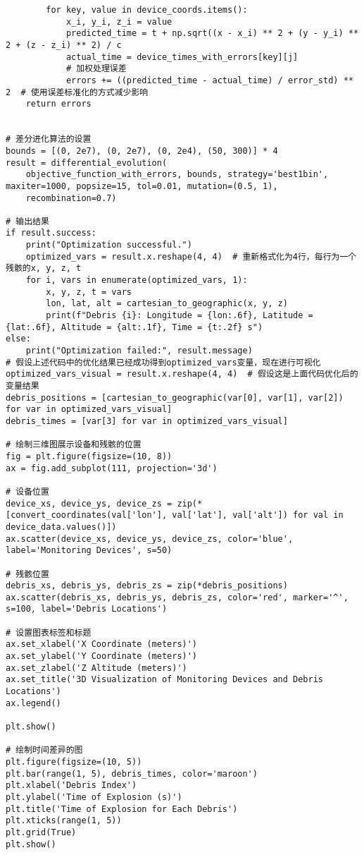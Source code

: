 \documentclass[withoutpreface,bwprint,12pt,a4paper]{cumcmthesis}
\begin{document}
\begin{appendices}
\begin{lstlisting}
        for key, value in device_coords.items():
            x_i, y_i, z_i = value
            predicted_time = t + np.sqrt((x - x_i) ** 2 + (y - y_i) ** 2 + (z - z_i) ** 2) / c
            actual_time = device_times_with_errors[key][j]
            # 加权处理误差
            errors += ((predicted_time - actual_time) / error_std) ** 2  # 使用误差标准化的方式减少影响
    return errors


# 差分进化算法的设置
bounds = [(0, 2e7), (0, 2e7), (0, 2e4), (50, 300)] * 4
result = differential_evolution(
    objective_function_with_errors, bounds, strategy='best1bin', maxiter=1000, popsize=15, tol=0.01, mutation=(0.5, 1),
    recombination=0.7)

# 输出结果
if result.success:
    print("Optimization successful.")
    optimized_vars = result.x.reshape(4, 4)  # 重新格式化为4行，每行为一个残骸的x, y, z, t
    for i, vars in enumerate(optimized_vars, 1):
        x, y, z, t = vars
        lon, lat, alt = cartesian_to_geographic(x, y, z)
        print(f"Debris {i}: Longitude = {lon:.6f}, Latitude = {lat:.6f}, Altitude = {alt:.1f}, Time = {t:.2f} s")
else:
    print("Optimization failed:", result.message)
# 假设上述代码中的优化结果已经成功得到optimized_vars变量，现在进行可视化
optimized_vars_visual = result.x.reshape(4, 4)  # 假设这是上面代码优化后的变量结果
debris_positions = [cartesian_to_geographic(var[0], var[1], var[2]) for var in optimized_vars_visual]
debris_times = [var[3] for var in optimized_vars_visual]

# 绘制三维图展示设备和残骸的位置
fig = plt.figure(figsize=(10, 8))
ax = fig.add_subplot(111, projection='3d')

# 设备位置
device_xs, device_ys, device_zs = zip(*[convert_coordinates(val['lon'], val['lat'], val['alt']) for val in device_data.values()])
ax.scatter(device_xs, device_ys, device_zs, color='blue', label='Monitoring Devices', s=50)

# 残骸位置
debris_xs, debris_ys, debris_zs = zip(*debris_positions)
ax.scatter(debris_xs, debris_ys, debris_zs, color='red', marker='^', s=100, label='Debris Locations')

# 设置图表标签和标题
ax.set_xlabel('X Coordinate (meters)')
ax.set_ylabel('Y Coordinate (meters)')
ax.set_zlabel('Z Altitude (meters)')
ax.set_title('3D Visualization of Monitoring Devices and Debris Locations')
ax.legend()

plt.show()

# 绘制时间差异的图
plt.figure(figsize=(10, 5))
plt.bar(range(1, 5), debris_times, color='maroon')
plt.xlabel('Debris Index')
plt.ylabel('Time of Explosion (s)')
plt.title('Time of Explosion for Each Debris')
plt.xticks(range(1, 5))
plt.grid(True)
plt.show()

 \end{lstlisting}

\end{appendices}
\end{document}
